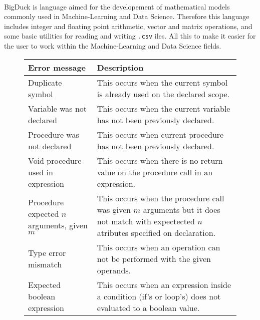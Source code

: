 \paragraph{} BigDuck is language aimed for the developement of mathematical
models commonly used in Machine-Learning and Data Science. Therefore this
language includes integer and floating point arithmetic, vector and matrix
operations, and some basic utilities for reading and writing \texttt{.csv} 
iles. All this to make it easier for the user to work within the
Machine-Learning and Data Science fields.

\begin{figure}[h]
    \centering
    \begin{tabular}{p{1.5in}p{2.5in}}
        \toprule
        \textbf{Error message} & \textbf{Description}\\

        \midrule Duplicate symbol &
        This occurs when the current symbol is already used on the declared
        scope.\\

        \midrule Variable was not \newline declared &
        This occurs when the current variable has not been \newline previously
        declared.\\

        \midrule Procedure was not \newline declared &
        This occurs when current procedure has not been \newline previously
        declared.\\

        \midrule Void procedure used \newline in expression &
        This occurs when there is no return value on the procedure call in
        an expression.\\

        \midrule Procedure expected $n$ \newline arguments, given $m$ &
        This occurs when the procedure call was given $m$ arguments but it
        does not match with expectected $n$ atributes specified on declaration.\\

        \midrule Type error mismatch &
        This occurs when an operation can not be performed with the given
        operands.\\

        \midrule Expected boolean \newline expression &
        This occurs when an expression inside a condition (if's or loop's) does
        not evaluated to a boolean value.\\


\end{tabular}
\end{figure}
